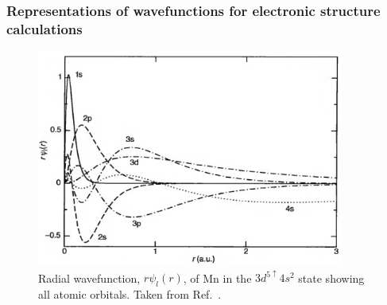 \documentclass[11pt, twoside]{report}
\begin{document}
\subsubsection{Representations of wavefunctions for electronic structure calculations}
\begin{figure}[h!]
  \centering
    \includegraphics[width=0.9\textwidth]{figures/atomic_radial_wavefunction.png}
    \caption[Radial wavefunction, $r\psi_l(r)$, of Mn in the $3d^{5\uparrow}4s^2$ state showing all atomic orbitals.]{Radial wavefunction, $r\psi_l(r)$, of Mn in the $3d^{5\uparrow}4s^2$ state showing all atomic orbitals. Taken from Ref.~.}
  \label{atomic_radial_wavefunction}
\end{figure}

\end{document}
